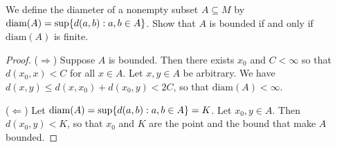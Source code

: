 \begin{exercise}{15}
We define the diameter of a nonempty subset $A\subseteq M$ by $\text{diam}(A)=\sup\{d(a,b):a,b\in A\}$. Show that $A$ is bounded if and only if $\text{diam}(A)$ is finite. 
\end{exercise}
\begin{proof}
($\Rightarrow$) Suppose $A$ is bounded. Then there exists $x_0$ and $C<\infty$ so that $d(x_0,x)<C$ for all $x\in A$. Let $x,y\in A$ be arbitrary. We have $d(x,y)\leq d(x,x_0)+d(x_0,y)<2C$, so that $\text{diam}(A)<\infty$.

($\Leftarrow$) Let $\text{diam}(A)=\sup\{d(a,b):a,b\in A\}=K$. Let $x_0,y\in A$. Then $d(x_0,y)<K$, so that $x_0$ and $K$ are the point and the bound that make $A$ bounded.
\end{proof} 
